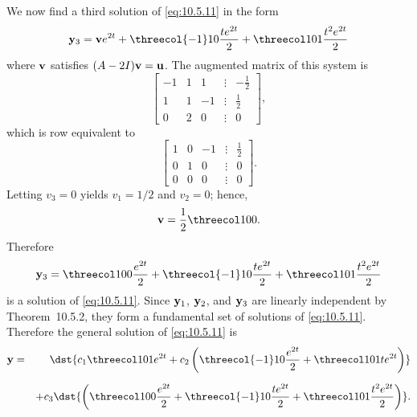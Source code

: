 \begin{examplesolution}
We now find a third solution of \eqref{eq:10.5.11} in the form
\[
  {\bf y}_{3}={\bf v}e^{2t}+\threecol{-1}10{\frac{te^{2t}}{2}}+\threecol101{\frac{t^{2}e^{2t}}{2}}
\]
where ${\bf v}$ satisfies $(A-2I){\bf v}={\bf u}$. The augmented matrix of this system is
\[
  \left[
  \begin{array}{rrrcr}
    -1 & 1 & 1  & \vdots & -\frac{1}{2} \\
    1  & 1 & -1 & \vdots & \frac{1}{2}  \\
    0  & 2 & 0  & \vdots & 0
  \end{array}\right],
\]
which is row equivalent to
\[
  \left[
  \begin{array}{rrrcr}
    1 & 0 & -1 & \vdots & \frac{1}{2} \\
    0 & 1 & 0  & \vdots & 0           \\
    0 & 0 & 0  & \vdots & 0
  \end{array}\right].
\]
Letting $v_{3}=0$ yields $v_{1}=1/2$ and $v_{2}=0$; hence,
\[
  {\bf v}=\frac{1}{2}\threecol100.
\]
Therefore
\[
  {\bf y}_{3}=\threecol100{\frac{e^{2t}}{2}}+ \threecol{-1}10{\frac{te^{2t}}{2}}+\threecol101{\frac{t^{2}e^{2t}}{2}}
\]
is a solution of \eqref{eq:10.5.11}. Since ${\bf y}_{1}$, ${\bf y}_{2}$, and ${\bf y}_{3}$ are
linearly independent by Theorem~10.5.2, they form a fundamental set of solutions of
\eqref{eq:10.5.11}. Therefore the general solution of \eqref{eq:10.5.11} is
\begin{eqnarray*}
  {\bf y} & = & \dst{c_{1}\threecol101e^{2t}+c_{2}\left(\threecol{-1}10{\frac{e^{2t}}{2}}+\threecol101te^{2t}\right)} \\[2\jot]
          &   & +c_{3}\dst{\left(\threecol100{\frac{e^{2t}}{2}}+\threecol{-1}10{\frac{te^{2t}}{2}}+\threecol101{\frac{t^{2}e^{2t}}{2}}\right)}.
\end{eqnarray*}
\end{examplesolution}

